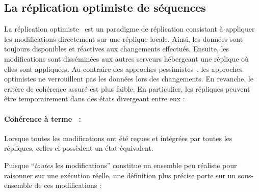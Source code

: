 
\subsection{La réplication optimiste de séquences}
\label{repl:subsec:optimistic}


La réplication optimiste~\cite{demers1987epidemic, johnson1975maintenance,
  ladin1992providing, saito2005optimistic} est un paradigme de réplication
consistant à appliquer les modifications directement sur une réplique locale.
Ainsi, les données sont toujours disponibles et réactives aux changements
effectués. Ensuite, les modifications sont disséminées aux autres serveurs
hébergeant une réplique où elles sont appliquées. Au contraire des approches
pessimistes~\cite{alsberg1976principle, gifford1979weighted}, les approches
optimistes ne verrouillent pas les données lors des changements. En revanche, le
critère de cohérence assuré est plus faible. En particulier, les répliques
peuvent être temporairement dans des états divergeant entre eux :


\paragraph{Cohérence à terme~\cite{bailis2013eventual} :} Lorsque toutes les
modifications ont été reçues et intégrées par toutes les répliques, celles-ci
possèdent un état équivalent.

\noindent Puisque ``\emph{toutes} les modifications'' constitue un ensemble peu
réaliste pour raisonner sur une exécution réelle, une définition plus précise
porte sur un sous-ensemble de ces modifications :

